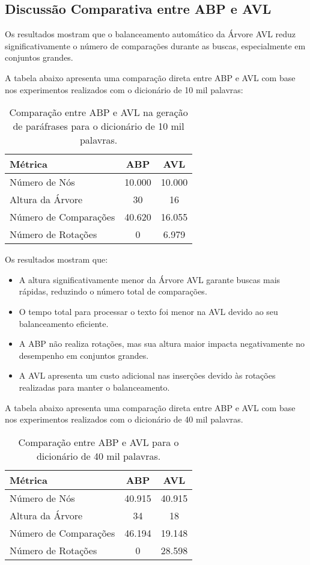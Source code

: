 \documentclass[a4paper, 12pt, english]{article}
\begin{document}
\newpage
\subsection{Discussão Comparativa entre ABP e AVL}
Os resultados mostram que o balanceamento automático da Árvore AVL reduz significativamente o número de comparações durante as buscas, especialmente em conjuntos grandes.

A tabela abaixo apresenta uma comparação direta entre ABP e AVL com base nos experimentos realizados com o dicionário de 10 mil palavras:

\begin{table}[H]
\centering
\begin{tabular}{|l|c|c|}
\hline
\rowcolor[gray]{0.9} Métrica & ABP & AVL \\ \hline
Número de Nós & 10.000 & 10.000 \\ \hline
Altura da Árvore & 30 & 16 \\ \hline
Número de Comparações & 40.620 & 16.055 \\ \hline
Número de Rotações & 0 & 6.979 \\ \hline
\end{tabular}
\caption{Comparação entre ABP e AVL na geração de paráfrases para o dicionário de 10 mil palavras.}
\label{tab:comparacao_abp_avl}
\end{table}

Os resultados mostram que:
\begin{itemize}
    \item A altura significativamente menor da Árvore AVL garante buscas mais rápidas, reduzindo o número total de comparações.
    \item O tempo total para processar o texto foi menor na AVL devido ao seu balanceamento eficiente.
    \item A ABP não realiza rotações, mas sua altura maior impacta negativamente no desempenho em conjuntos grandes.
    \item A AVL apresenta um custo adicional nas inserções devido às rotações realizadas para manter o balanceamento.
\end{itemize}

A tabela abaixo apresenta uma comparação direta entre ABP e AVL com base nos experimentos realizados com o dicionário de 40 mil palavras.

\begin{table}[H]
\centering
\begin{tabular}{|l|c|c|}
\hline
\rowcolor[gray]{0.9} Métrica & ABP & AVL \\ \hline
Número de Nós & 40.915 & 40.915 \\ \hline
Altura da Árvore & 34 & 18 \\ \hline
Número de Comparações & 46.194 & 19.148 \\ \hline
Número de Rotações & 0 & 28.598 \\ \hline
\end{tabular}
\caption{Comparação entre ABP e AVL para o dicionário de 40 mil palavras.}
\label{tab:comparacao_abp_avl_40k}
\end{table}
\end{document}
